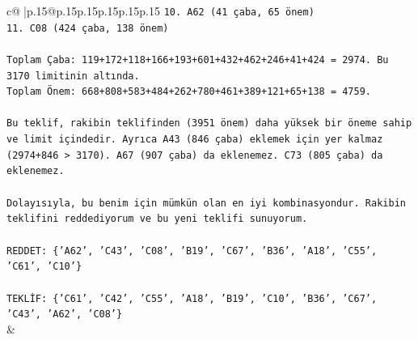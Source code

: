 \documentclass{article}
\begin{document}
{\begin{supertabular}{c@{$\;$}|p{.15\linewidth}@{}p{.15\linewidth}p{.15\linewidth}p{.15\linewidth}p{.15\linewidth}p{.15\linewidth}}
{{{\texttt{10. A62 (41 çaba, 65 önem)} \\
\texttt{11. C08 (424 çaba, 138 önem)} \\
\\ 
\texttt{Toplam Çaba: 119+172+118+166+193+601+432+462+246+41+424 = 2974. Bu 3170 limitinin altında.} \\
\texttt{Toplam Önem: 668+808+583+484+262+780+461+389+121+65+138 = 4759.} \\
\\ 
\texttt{Bu teklif, rakibin teklifinden (3951 önem) daha yüksek bir öneme sahip ve limit içindedir. Ayrıca A43 (846 çaba) eklemek için yer kalmaz (2974+846 > 3170). A67 (907 çaba) da eklenemez. C73 (805 çaba) da eklenemez.} \\
\\ 
\texttt{Dolayısıyla, bu benim için mümkün olan en iyi kombinasyondur. Rakibin teklifini reddediyorum ve bu yeni teklifi sunuyorum.} \\
\\ 
\texttt{REDDET: \{'A62', 'C43', 'C08', 'B19', 'C67', 'B36', 'A18', 'C55', 'C61', 'C10'\}} \\
\\ 
\texttt{TEKLİF: \{'C61', 'C42', 'C55', 'A18', 'B19', 'C10', 'B36', 'C67', 'C43', 'A62', 'C08'\}} \\
            }
        }
    }
    & \\ \\


\end{supertabular}}
\end{document}
